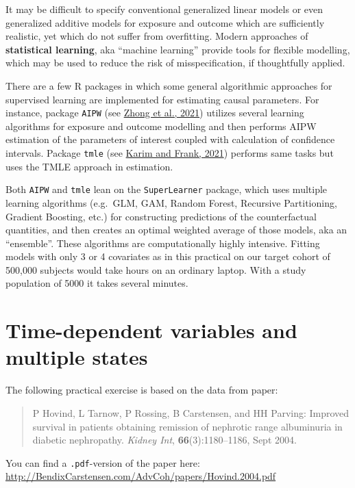 \documentclass[
]{book}
\begin{document}
It may be difficult to specify
conventional generalized linear models
or even generalized additive
models for exposure and outcome which are
sufficiently realistic, yet which do not suffer from overfitting.
Modern approaches of \textbf{statistical learning}, aka
``machine learning'' provide tools for flexible modelling,
which may be used to reduce the risk of misspecification,
if thoughtfully applied.

There are a few R packages in which some general
algorithmic approaches for supervised learning
are implemented for estimating causal parameters.
For instance, package \texttt{AIPW}
(see \href{https://doi.org/10.1093/aje/kwab207}{Zhong et al., 2021})
utilizes
several learning algorithms for exposure and outcome modelling
and then performs AIPW estimation of the
parameters of interest coupled with
calculation of confidence intervals. Package \texttt{tmle}
(see \href{https://ehsanx.github.io/TMLEworkshop/}{Karim and Frank, 2021})
performs same tasks but uses the TMLE approach
in estimation.

Both \texttt{AIPW} and \texttt{tmle} lean on the
\texttt{SuperLearner} package, which uses multiple learning
algorithms (e.g.~GLM, GAM, Random Forest, Recursive Partitioning,
Gradient Boosting, etc.) for constructing
predictions of the counterfactual quantities, and
then creates an optimal weighted average of those models,
aka an ``ensemble''. These algorithms are computationally
highly intensive. Fitting models with only 3 or 4
covariates as in this practical
on our target cohort of 500,000 subjects
would take hours on an ordinary laptop. With a study population
of 5000 it takes several minutes.

\chapter{Time-dependent variables and multiple states}\label{time-dependent-variables-and-multiple-states}

The following practical exercise is based on the data from paper:

\begin{quote}
P Hovind, L Tarnow, P Rossing, B Carstensen, and HH Parving:
Improved survival in patients obtaining remission of nephrotic range
albuminuria in diabetic nephropathy.
\emph{Kidney Int}, \textbf{66}(3):1180--1186, Sept 2004.
\end{quote}

You can find a \texttt{.pdf}-version of the paper here:
\url{http://BendixCarstensen.com/AdvCoh/papers/Hovind.2004.pdf}
\end{document}
